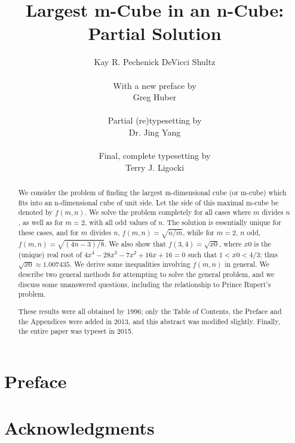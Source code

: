 \documentclass[12pt,titlepage]{article}
\title{\bf Largest m-Cube in an n-Cube: \\
       Partial Solution
      }
\author{Kay R. Pechenick DeVicci Shultz \\
        \\
        With a new preface by \\
        Greg Huber \\
        \\
        Partial (re)typesetting by \\
        Dr. Jing Yang \\
        \\
        Final, complete typesetting by \\
        Terry J. Ligocki
       }
\begin{document}
\maketitle

\begin{abstract}
We consider the problem of finding the largest m-dimensional cube (or
m-cube) which fits into an n-dimensional cube of unit side. Let the side of
this maximal m-cube be denoted by $f(m,n)$. We solve the problem completely
for all cases where $m$ divides $n$, as well as for $m = 2$, with all odd
values of $n$. The solution is essentially unique for these cases, and for
$m$ divides $n$, $f(m,n) = \sqrt{n/m}$, while for $m = 2$, $n$ odd, $f(m,
n) = \sqrt{(4n-3)/8}$. We also show that $f(3, 4) = \sqrt{x0}$, where $x0$
is the (unique) real root of $4x^4-28x^3-7x^2+16x+16=0$ such that $1 < x0 <
4/3$; thus $\sqrt{x0} \approx 1.007435$. We derive some inequalities involving
$f(m,n)$ in general. We describe two general methods for attempting to solve
the general problem, and we discuss some unanswered questions, including the
relationship to Prince Rupert's problem.

These results were all obtained by 1996; only the Table of Contents, the
Preface and the Appendices were added in 2013, and this abstract was modified
slightly. Finally, the entire paper was typeset in 2015.
\end{abstract}

\tableofcontents
\newpage


\section*{Preface}

\newpage


\newpage


\newpage

\section*{Acknowledgments}

\newpage

\appendix




\end{document}
